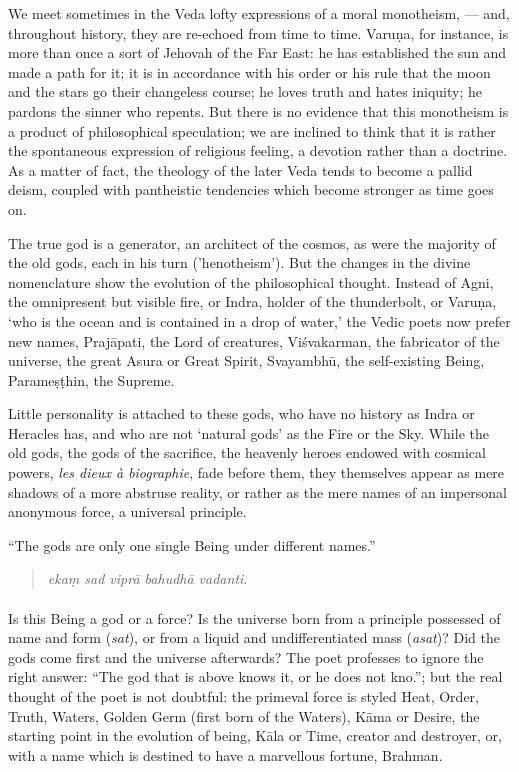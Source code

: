 \documentclass[a4paper, 11pt, oneside, english, landscape]{article}
\begin{document}
We meet sometimes in the Veda lofty expressions of a moral monotheism, --- and, throughout history, they are re-echoed from time to time. Varuṇa, for instance, is more than once a sort of Jehovah of the Far East: he has established the sun and made a path for it; it is in accordance with his order or his rule that the moon and the stars go their changeless course; he loves truth and hates iniquity; he pardons the sinner who repents. But there is no evidence that this monotheism is a product of philosophical speculation; we are inclined to think that it is rather the spontaneous expression of religious feeling, a devotion rather than a doctrine. As a matter of fact, the theology of the later Veda tends to become a pallid deism, coupled with pantheistic tendencies which become stronger as time goes on.

The true god is a generator, an architect of the cosmos, as were the majority of the old gods, each in his turn ('henotheism'). But the changes in the divine nomenclature show the evolution of the philosophical thought. Instead of Agni, the omnipresent but visible fire, or Indra, holder of the thunderbolt, or Varuṇa, `who is the ocean and is contained in a drop of water,' the Vedic poets now prefer new names, Prajāpati, the Lord of creatures, Viśvakarman, the fabricator of the universe, the great Asura or Great Spirit, Svayambhū, the self-existing Being, Parameṣṭhin, the Supreme.

Little personality is attached to these gods, who have no history as Indra or Heracles has, and who are not `natural gods' as the Fire or the Sky. While the old gods, the gods of the sacrifice, the heavenly heroes endowed with cosmical powers, \emph{les dieux à biographie}, fade before them, they themselves appear as mere shadows of a more abstruse reality, or rather as the mere names of an impersonal anonymous force, a universal principle.

``The gods are only one single Being under different names.''
\begin{quotation}
\small
\emph{ekaṃ sad viprā bahudhā vadanti}.
\end{quotation}
\paragraph{}
Is this Being a god or a force? Is the universe born from a principle possessed of name and form (\emph{sat}), or from a liquid and undifferentiated mass (\emph{asat})? Did the gods come first and the universe afterwards? The poet professes to ignore the right answer: ``The god that is above knows it, or he does not kno.''; but the real thought of the poet is not doubtful: the primeval force is styled Heat, Order, Truth, Waters, Golden Germ (first born of the Waters), Kāma or Desire, the starting point in the evolution of being, Kāla or Time, creator and destroyer, or, with a name which is destined to have a marvellous fortune, Brahman.
\end{document}
